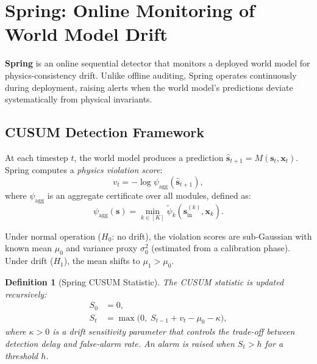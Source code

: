 \documentclass[11pt,twocolumn]{article}
\newtheorem{definition}[theorem]{Definition}
\theoremstyle{definition}
\begin{document}
\section{Spring: Online Monitoring of World Model Drift}
\label{sec:spring}

\textbf{Spring} is an online sequential detector that monitors a deployed
world model for physics-consistency drift.  Unlike offline auditing, Spring
operates continuously during deployment, raising alerts when the world model's
predictions deviate systematically from physical invariants.

\subsection{CUSUM Detection Framework}

At each timestep $t$, the world model produces a prediction
$\hat{\mathbf{s}}_{t+1} = M(\mathbf{s}_t, \mathbf{x}_t)$.  Spring computes a
\emph{physics violation score}:
\begin{equation}
  v_t = -\log \psi_{\text{agg}}(\hat{\mathbf{s}}_{t+1}),
\end{equation}
where $\psi_{\text{agg}}$ is an aggregate certificate over all modules,
defined as:
\begin{equation}
  \psi_{\text{agg}}(\mathbf{s}) =
  \min_{k \in [K]} \tilde{\psi}_k(\mathbf{s}_{\text{in}}^{(k)}, \mathbf{x}_k).
\end{equation}

Under normal operation ($H_0$: no drift), the violation scores are
sub-Gaussian with known mean $\mu_0$ and variance proxy $\sigma_0^2$ (estimated
from a calibration phase).  Under drift ($H_1$), the mean shifts to
$\mu_1 > \mu_0$.

\begin{definition}[Spring CUSUM Statistic]
The CUSUM statistic is updated recursively:
\begin{align}
  S_0 &= 0, \\
  S_t &= \max\bigl(0,\; S_{t-1} + v_t - \mu_0 - \kappa\bigr),
  \label{eq:cusum}
\end{align}
where $\kappa > 0$ is a \emph{drift sensitivity} parameter that controls the
trade-off between detection delay and false-alarm rate.  An alarm is raised
when $S_t > h$ for a threshold $h$.
\end{definition}
\end{document}
